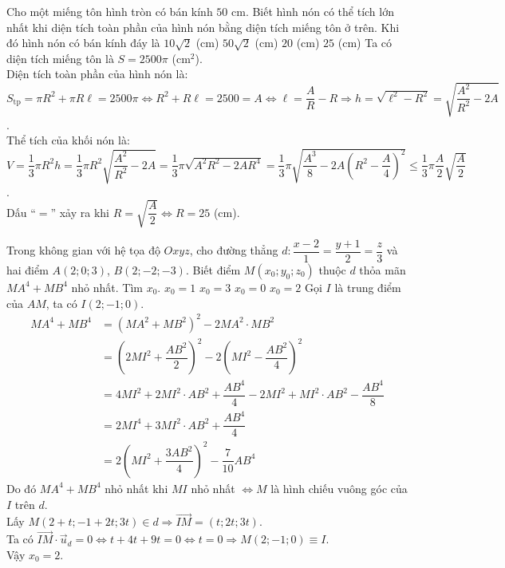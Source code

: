 \begin{ex}%
Cho một miếng tôn hình tròn có bán kính $50$ cm. Biết hình nón có thể tích lớn nhất khi diện tích toàn phần của hình nón bằng diện tích miếng tôn ở trên. Khi đó hình nón có bán kính đáy là
\choice
{$10\sqrt{2}$ (cm)}
{$50\sqrt{2}$ (cm)}
{$20$ (cm)}
{\True $25$ (cm)}
\loigiai
{
Ta có diện tích miếng tôn là $S=2500\pi$ ($\text{cm}^2$).\\
Diện tích toàn phần của hình nón là:\\ $S_{\text{tp}}=\pi R^2+\pi R\ell=2500\pi\Leftrightarrow R^2+R\ell=2500=A\Leftrightarrow\ell=\dfrac{A}{R}-R\Rightarrow h=\sqrt{\ell^2-R^2}=\sqrt{\dfrac{A^2}{R^2}-2A}$.\\
Thể tích của khối nón là:\\
$V=\dfrac{1}{3}\pi R^2h=\dfrac{1}{3}\pi R^2\sqrt{\dfrac{A^2}{R^2}-2A}=\dfrac{1}{3}\pi \sqrt{A^2R^2-2AR^4}=\dfrac{1}{3}\pi \sqrt{\dfrac{A^3}{8}-2A\left(R^2-\dfrac{A}{4}\right)^2}\leq \dfrac{1}{3}\pi \dfrac{A}{2}\sqrt{\dfrac{A}{2}}$.\\Dấu ``$=$'' xảy ra khi $R=\sqrt{\dfrac{A}{2}}\Leftrightarrow R=25$ (cm).
}
\end{ex}

\begin{ex}%
Trong không gian với hệ tọa độ $Oxyz$, cho đường thẳng $d:\dfrac{x-2}{1}=\dfrac{y+1}{2}=\dfrac{z}{3}$ và hai điểm $A(2;0;3)$,  $B(2;-2;-3)$. Biết điểm $M\left(x_0;y_0;z_0\right)$ thuộc $d$ thỏa mãn $MA^4+MB^4$ nhỏ nhất. Tìm $x_0$.
\choice
{$x_0=1$}
{$x_0=3$}
{$x_0=0$}
{\True $x_0=2$}
\loigiai
{
Gọi $I$ là trung điểm của $AM$, ta có $I(2;-1;0)$.
\begin{align*}
MA^4+MB^4&=\left(MA^2+MB^2\right)^2-2MA^2\cdot MB^2\\ 
&=\left(2MI^2+\dfrac{AB^2}{2}\right)^2-2\left(MI^2-\dfrac{AB^2}{4}\right)^2\\
&=4MI^2+2MI^2\cdot AB^2+\dfrac{AB^4}{4}-2MI^2+MI^2\cdot AB^2-\dfrac{AB^4}{8}\\
&=2MI^4+3MI^2\cdot AB^2+\dfrac{AB^4}{4}\\
&=2\left(MI^2+\dfrac{3AB^2}{4}\right)^2-\dfrac{7}{10}AB^4
\end{align*}
Do đó $MA^4+MB^4$ nhỏ nhất khi $MI$ nhỏ nhất $\Leftrightarrow M$ là hình chiếu vuông góc của $I$ trên $d$.\\
Lấy $M(2+t; -1+2t; 3t)\in d\Rightarrow \vec{IM}=(t; 2t; 3t)$.\\Ta có $\vec{IM}\cdot\vec{u}_d=0\Leftrightarrow t+4t+9t=0\Leftrightarrow t=0\Rightarrow M(2;-1;0)\equiv I$.\\Vậy $x_0=2$.
}
\end{ex}


